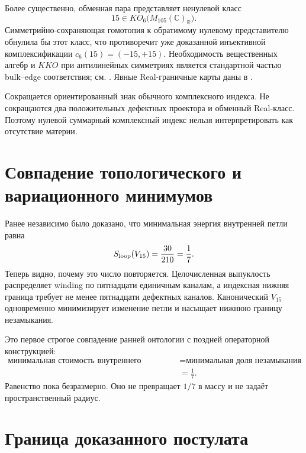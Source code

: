 Более существенно, обменная пара представляет ненулевой класс
\begin{equation}
 15\in KO_6\bigl(M_{105}(\mathbb C)_{\mathbb R}\bigr).
\end{equation}
Симметрийно-сохраняющая
гомотопия к обратимому нулевому представителю обнулила бы этот класс, что
противоречит уже доказанной инъективной комплексификации
$c_6(15)=(-15,+15)$. Необходимость вещественных алгебр и $KKO$ при
антилинейных симметриях является стандартной частью bulk--edge
соответствия; см. . Явные Real-граничные карты
даны в .

\begin{remark}
Сокращается ориентированный знак обычного комплексного индекса. Не
сокращаются два положительных дефектных проектора и обменный Real-класс.
Поэтому нулевой суммарный комплексный индекс нельзя интерпретировать как
отсутствие материи.
\end{remark}

\section{Совпадение топологического и вариационного минимумов}

Ранее независимо было доказано, что минимальная энергия внутренней петли
равна
\begin{equation}
 S_{\rm loop}(V_{15})=\frac{30}{210}=\frac17.
\end{equation}
Теперь видно, почему это число повторяется. Целочисленная выпуклость
распределяет winding по пятнадцати единичным каналам, а индексная нижняя
граница требует не менее пятнадцати дефектных каналов. Канонический
$V_{15}$ одновременно минимизирует изменение петли и насыщает нижнюю
границу незамыкания.

Это первое строгое совпадение ранней онтологии с поздней операторной
конструкцией:
\begin{equation}
 \begin{aligned}
  \text{минимальная стоимость внутреннего перехода}
  &=\text{минимальная доля незамыкания}\\
  &=\frac17.
 \end{aligned}
 \label{eq:v5-two-minima-one-seventh}
\end{equation}
Равенство пока безразмерно. Оно не превращает $1/7$ в массу и не задаёт
пространственный радиус.

\section{Граница доказанного постулата}

